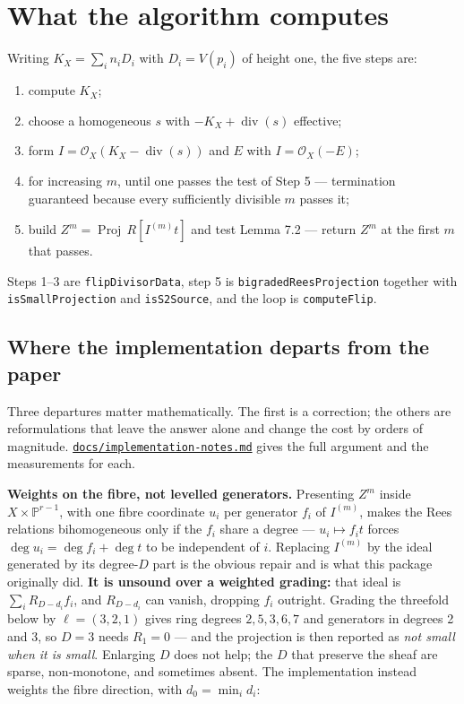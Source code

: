 \documentclass[11pt,reqno]{amsart}
\providecommand{\tightlist}{%
  \setlength{\itemsep}{0pt}\setlength{\parskip}{0pt}}
\newcommand{\PP}{\ensuremath{\mathbb{P}}}
\newcommand{\sO}{\ensuremath{\mathcal{O}}}
\DeclareMathOperator{\Proj}{Proj}
\DeclareMathOperator{\divisor}{div}
\theoremstyle{plain}
\theoremstyle{definition}
\begin{document}
\section{What the algorithm
computes}\label{what-the-algorithm-computes}

Writing \(K_X = \sum_i n_i D_i\) with \(D_i = V(p_i)\) of height one,
the five steps are:

\begin{enumerate}
\def\labelenumi{\arabic{enumi}.}
\tightlist
\item
  compute \(K_X\);
\item
  choose a homogeneous \(s\) with \(-K_X + \divisor(s)\) effective;
\item
  form \(I = \sO_X(K_X - \divisor(s))\) and \(E\) with
  \(I = \sO_X(-E)\);
\item
  for increasing \(m\), until one passes the test of Step 5 ---
  termination guaranteed because every sufficiently divisible \(m\)
  passes it;
\item
  build \(Z^m = \Proj\, R[I^{(m)}t]\) and test Lemma 7.2 ---
  return \(Z^m\) at the first \(m\) that passes.
\end{enumerate}

Steps 1--3 are \texttt{flipDivisorData}, step 5 is
\texttt{bigradedReesProjection} together with \texttt{isSmallProjection}
and \texttt{isS2Source}, and the loop is \texttt{computeFlip}.

\subsection{Where the implementation departs from the
paper}\label{where-the-implementation-departs-from-the-paper}

Three departures matter mathematically. The first is a correction; the
others are reformulations that leave the answer alone and change the
cost by orders of magnitude.
\href{https://github.com/takehikoyasuda/flip-computation/blob/main/docs/implementation-notes.md}{\texttt{docs/implementation-notes.md}}
gives the full argument and the measurements for each.

\textbf{Weights on the fibre, not levelled generators.} Presenting
\(Z^m\) inside \(X \times \PP^{r-1}\), with one fibre coordinate \(u_i\)
per generator \(f_i\) of \(I^{(m)}\), makes the Rees relations
bihomogeneous only if the \(f_i\) share a degree ---
\(u_i \mapsto f_i t\) forces \(\deg u_i = \deg f_i + \deg t\) to be
independent of \(i\). Replacing \(I^{(m)}\) by the ideal generated by
its degree-\(D\) part is the obvious repair and is what this package
originally did. \textbf{It is unsound over a weighted grading:} that
ideal is \(\sum_i R_{D-d_i} f_i\), and \(R_{D-d_i}\) can vanish,
dropping \(f_i\) outright. Grading the threefold below by
\(\ell = (3,2,1)\) gives ring degrees \(2,5,3,6,7\) and generators in
degrees 2 and 3, so \(D = 3\) needs \(R_1 = 0\) --- and the projection
is then reported as \emph{not small when it is small}. Enlarging \(D\)
does not help; the \(D\) that preserve the sheaf are sparse,
non-monotone, and sometimes absent. The implementation instead weights
the fibre direction, with \(d_0 = \min_i d_i\):
\end{document}
